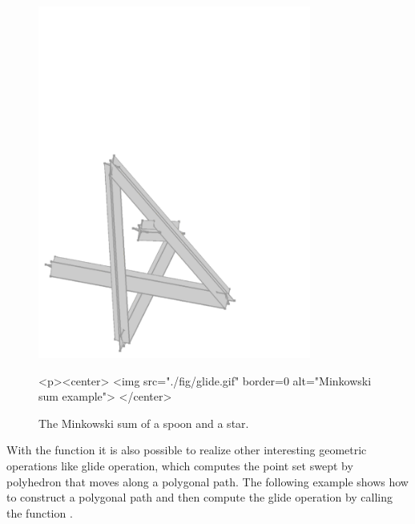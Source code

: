 \begin{figure}
  \begin{ccTexOnly}
    \begin{center}
      \includegraphics[width=0.8\textwidth]{Minkowski_sum_3/fig/glide}
    \end{center}
  \end{ccTexOnly}
  \begin{ccHtmlOnly}
    <p><center>
    <img src="./fig/glide.gif" border=0 alt="Minkowski sum example">
    </center>
  \end{ccHtmlOnly}
  \caption{The Minkowski sum of a spoon and a star.}
\end{figure}

With the function  it is also possible to realize
other interesting geometric operations like glide operation, which
computes the point set swept by polyhedron that moves along a
polygonal path. The following example shows how to construct a
polygonal path and then compute the glide operation by calling the
function .

